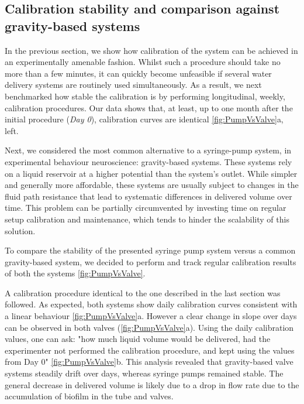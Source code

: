 \subsection*{Calibration stability and comparison against gravity-based systems}

In the previous section, we show how calibration of the system can be achieved in an experimentally amenable fashion. Whilst such a procedure should take no more than a few minutes, it can quickly become unfeasible if several water delivery systems are routinely used simultaneously. As a result, we next benchmarked how stable the calibration is by performing longitudinal, weekly, calibration procedures. Our data shows that, at least, up to one month after the initial procedure (\textit{Day 0}), calibration curves are identical \ref{fig:PumpVsValve}a, left.

Next, we considered the most common alternative to a syringe-pump system, in experimental behaviour neuroscience: gravity-based systems. These systems rely on a liquid reservoir at a higher potential than the system's outlet. While simpler and generally more affordable, these systems are usually subject to changes in the fluid path resistance that lead to systematic differences in delivered volume over time. This problem can be partially circumvented by investing time on regular setup calibration and maintenance, which tends to hinder the scalability of this solution.

To compare the stability of the presented syringe pump system versus a common gravity-based system, we decided to perform and track regular calibration results of both the systems \cref{fig:PumpVsValve}.

A calibration procedure identical to the one described in the last section was followed. As expected, both systems show daily calibration curves consistent with a linear behaviour \cref{fig:PumpVsValve}a. However a clear change in slope over days can be observed in both valves (\cref{fig:PumpVsValve}a). Using the daily calibration values, one can ask: "how much liquid volume would be delivered, had the experimenter not performed the calibration procedure, and kept using the values from Day 0" \cref{fig:PumpVsValve}b. This analysis revealed that gravity-based valve systems steadily drift over days, whereas syringe pumps remained stable. The general decrease in delivered volume is likely due to a drop in flow rate due to the accumulation of biofilm in the tube and valves. 

